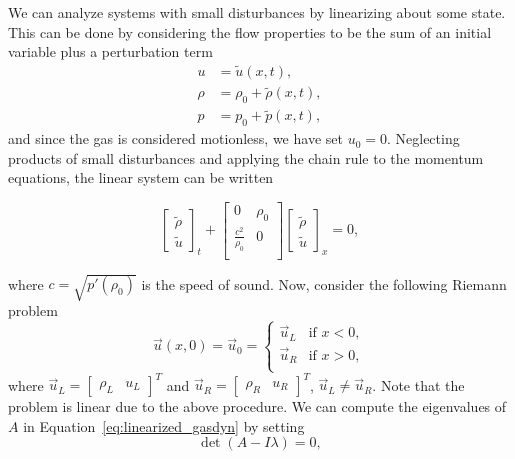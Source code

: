 We can analyze systems with small disturbances by linearizing about some state. This can be done by considering the flow properties to be the sum of an initial variable plus a perturbation term
\begin{align}
	u &= \tilde u(x,t), \\
	\rho &= \rho_0 + \tilde \rho(x,t), \\
	p & = p_0 + \tilde p(x,t),
\end{align}
and since the gas is considered motionless, we have set $u_0=0$. Neglecting products of small disturbances and applying the chain rule to the momentum equations, the linear system can be written 
\begin{eqBox}
\begin{equation}
	\begin{bmatrix}
		\tilde \rho \\  \tilde u
	\end{bmatrix}_t 
	+ \begin{bmatrix}
		0 & \rho_0 \\
		\frac{c^2}{\rho_0} & 0 \\
	\end{bmatrix}
	\begin{bmatrix}
		\tilde \rho \\  \tilde u
	\end{bmatrix}_x
	= 0,
	\label{eq:linearized_gasdyn}
\end{equation}
\end{eqBox}
where $c=\sqrt{p'(\rho_0)}$ is the speed of sound. Now, consider the following Riemann problem
\begin{equation}
	\vec u(x,0) = \vec u_0 = 
	\begin{cases}
		\vec u_L & \text{if }x<0, \\
		\vec u_R & \text{if }x>0,\\
	\end{cases}
\end{equation}
where $\vec u_L = \begin{bmatrix} \rho_L & u_L \end{bmatrix}^T$ and $\vec u_R = \begin{bmatrix} \rho_R & u_R \end{bmatrix}^T$, $\vec u_L \neq \vec u_R$. Note that the problem is linear due to the above procedure. We can compute the eigenvalues of $A$ in Equation~\ref{eq:linearized_gasdyn} by setting
\begin{equation}
	\det(A-I\lambda) = 0,
\end{equation}
